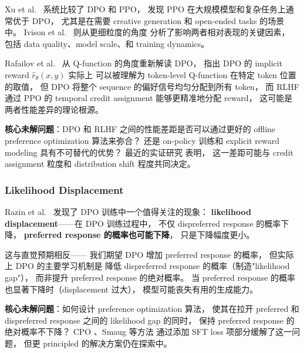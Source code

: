 Xu et al.\ \cite{xu2024dposuperior} 系统比较了 DPO 和 PPO，
发现 PPO 在大规模模型和复杂任务上通常优于 DPO，
尤其是在需要 creative generation 和 open-ended tasks 的场景中。
Ivison et al.\ \cite{ivison2024unpacking} 则从更细粒度的角度
分析了影响两者相对表现的关键因素，
包括 data quality、model scale、和 training dynamics。

Rafailov et al.\ \cite{rafailov2024rtoq} 从 Q-function 的角度重新解读 DPO，
指出 DPO 的 implicit reward $\hat{r}_\theta(x, y)$ 实际上
可以被理解为 token-level Q-function 在特定 token 位置的取值，
但 DPO 将整个 sequence 的偏好信号均匀分配到所有 token，
而 RLHF 通过 PPO 的 temporal credit assignment 能够更精准地分配 reward，
这可能是两者性能差异的理论根源。

\begin{openproblembox}
\textbf{核心未解问题}：DPO 和 RLHF 之间的性能差距是否可以通过更好的
offline preference optimization 算法来弥合？
还是 on-policy 训练和 explicit reward modeling 具有不可替代的优势？
最近的实证研究 \cite{performance2025gap} 表明，
这一差距可能与 credit assignment 粒度和 distribution shift 程度共同决定。
\end{openproblembox}

\subsubsection{Likelihood Displacement}
\label{sec:t2-displacement}

Razin et al.\ \cite{razin2024displacement} 发现了 DPO 训练中一个值得关注的现象：
\textbf{likelihood displacement}——在 DPO 训练过程中，
不仅 dispreferred response 的概率下降，
\textbf{preferred response 的概率也可能下降}，
只是下降幅度更小。

这与直觉预期相反——
我们期望 DPO 增加 preferred response 的概率，
但实际上 DPO 的主要学习机制是
降低 dispreferred response 的概率（制造"likelihood gap"），
而非提升 preferred response 的绝对概率。
当 preferred response 的概率也显著下降时（displacement 过大），
模型可能丧失有用的生成能力。

\begin{openproblembox}
\textbf{核心未解问题}：如何设计 preference optimization 算法，
使其在拉开 preferred 和 dispreferred response 之间的 likelihood gap 的同时，
保持 preferred response 的绝对概率不下降？
CPO \cite{xu2024cpo}、Smaug \cite{pal2024smaug} 等方法
通过添加 SFT loss 项部分缓解了这一问题，
但更 principled 的解决方案仍在探索中。
\end{openproblembox}

